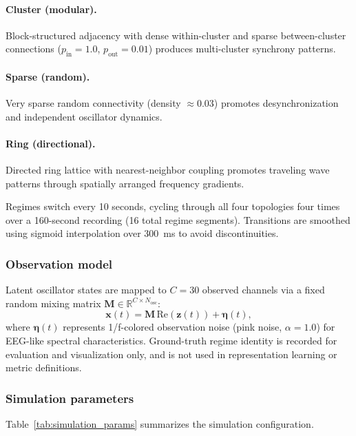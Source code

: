 \documentclass[5p,twocolumn,authoryear]{elsarticle}
\begin{document}
\paragraph{Cluster (modular).} Block-structured adjacency with dense within-cluster and sparse between-cluster connections ($p_{\text{in}}=1.0$, $p_{\text{out}}=0.01$) produces multi-cluster synchrony patterns.

\paragraph{Sparse (random).} Very sparse random connectivity (density $\approx 0.03$) promotes desynchronization and independent oscillator dynamics.

\paragraph{Ring (directional).} Directed ring lattice with nearest-neighbor coupling promotes traveling wave patterns through spatially arranged frequency gradients.

Regimes switch every 10 seconds, cycling through all four topologies four times over a 160-second recording (16 total regime segments). Transitions are smoothed using sigmoid interpolation over 300~ms to avoid discontinuities.

\subsubsection{Observation model}

Latent oscillator states are mapped to $C=30$ observed channels via a fixed random mixing matrix $\mathbf{M} \in \mathbb{R}^{C \times N_{\text{osc}}}$:
\begin{equation}
\mathbf{x}(t) = \mathbf{M}\,\text{Re}(\mathbf{z}(t)) + \boldsymbol{\eta}(t),
\end{equation}
where $\boldsymbol{\eta}(t)$ represents 1/f-colored observation noise (pink noise, $\alpha=1.0$) for EEG-like spectral characteristics. Ground-truth regime identity is recorded for evaluation and visualization only, and is not used in representation learning or metric definitions.

\subsubsection{Simulation parameters}

Table~\ref{tab:simulation_params} summarizes the simulation configuration.
\end{document}
